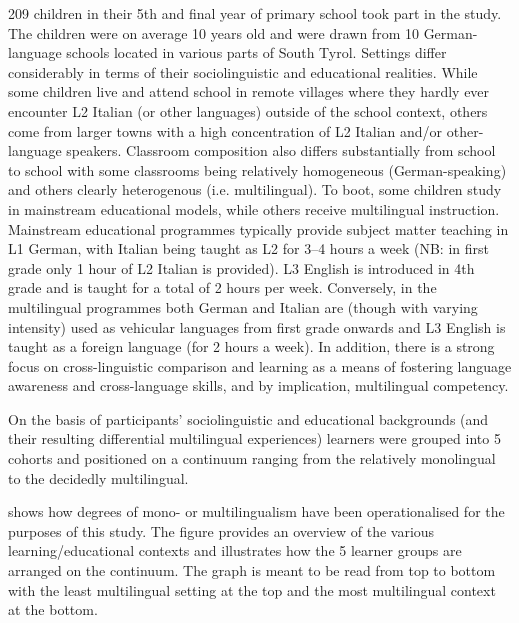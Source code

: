 \documentclass[output=paper]{../langscibook}
\begin{document}
209 children in their 5th and final year of primary school took part in the study. The children were on average 10 years old and were drawn from 10 German-language schools located in various parts of South Tyrol. Settings differ considerably in terms of their sociolinguistic and educational realities. While some children live and attend school in remote villages where they hardly ever encounter L2 Italian (or other languages) outside of the school context, others come from larger towns with a high concentration of L2 Italian and/or other-language speakers. Classroom composition also differs substantially from school to school with some classrooms being relatively homogeneous (German-speaking) and others clearly heterogenous (i.e. multilingual). To boot, some children study in mainstream educational models, while others receive multilingual instruction. Mainstream educational programmes typically provide subject matter teaching in L1 German, with Italian being taught as L2 for 3--4 hours a week (NB: in first grade only 1 hour of L2 Italian is provided). L3 English is introduced in 4th grade and is taught for a total of 2 hours per week. Conversely, in the multilingual programmes both German and Italian are (though with varying intensity) used as vehicular languages from first grade onwards and L3 English is taught as a foreign language (for 2 hours a week). In addition, there is a strong focus on cross-linguistic comparison and learning as a means of fostering language awareness and cross-language skills, and by implication, multilingual competency.

On the basis of participants’ sociolinguistic and educational backgrounds (and their resulting differential multilingual experiences) learners were grouped into 5 cohorts and positioned on a continuum ranging from the relatively monolingual to the decidedly multilingual. 

 shows how degrees of mono- or multilingualism have been operationalised for the purposes of this study. The figure provides an overview of the various learning/educational contexts and illustrates how the 5 learner groups are arranged on the continuum. The graph is meant to be read from top to bottom with the least multilingual setting at the top and the most multilingual context at the bottom.
\end{document}
